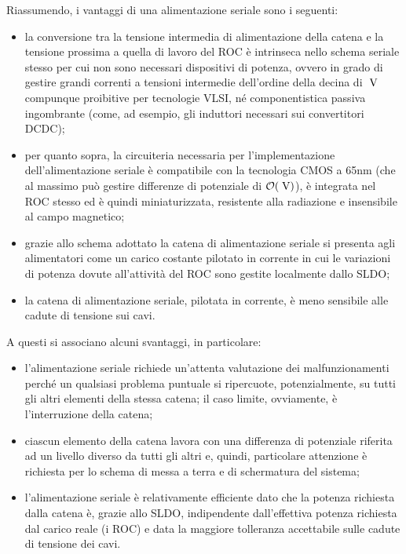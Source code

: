 Riassumendo, i vantaggi di una alimentazione seriale sono i seguenti:
\begin{itemize}
\item la conversione tra la tensione intermedia di alimentazione della catena e la tensione prossima a quella di lavoro del ROC \`e intrinseca nello schema seriale stesso per cui non sono necessari dispositivi di potenza, ovvero in grado di gestire grandi correnti a tensioni intermedie dell'ordine della decina di $\rm \; V$ compunque proibitive per tecnologie VLSI, n\'e componentistica passiva ingombrante (come, ad esempio, gli induttori necessari sui convertitori DCDC);
\item per quanto sopra, la circuiteria necessaria per l'implementazione dell'alimentazione seriale \`e compatibile con la tecnologia CMOS a 65nm (che al massimo pu\`o gestire differenze di potenziale di ${\cal O}(\rm \; V)$), \`e integrata nel ROC stesso ed \`e quindi miniaturizzata, resistente alla radiazione e insensibile al campo magnetico; 
\item grazie allo schema adottato la catena di alimentazione seriale si presenta agli alimentatori come un carico costante pilotato in corrente in cui le variazioni di potenza dovute all'attivit\`a del ROC sono gestite localmente dallo SLDO;
\item la catena di alimentazione seriale, pilotata in corrente, \`e meno sensibile alle cadute di tensione sui cavi.
\end{itemize}
A questi si associano alcuni svantaggi, in particolare:
\begin{itemize}
\item l'alimentazione seriale richiede un'attenta valutazione dei malfunzionamenti perch\'e un qualsiasi problema puntuale si ripercuote, potenzialmente, su tutti gli altri elementi della stessa catena; il caso limite, ovviamente, \`e l'interruzione della catena;
\item ciascun elemento della catena lavora con una differenza di potenziale riferita ad un livello diverso da tutti gli altri e, quindi, particolare attenzione \`e richiesta per lo schema di messa a terra e di schermatura del sistema;
\item l'alimentazione seriale \`e relativamente efficiente dato che la potenza richiesta dalla catena \`e, grazie allo SLDO, indipendente dall'effettiva potenza richiesta dal carico reale (i ROC) e data la maggiore tolleranza accettabile sulle cadute di tensione dei cavi. 
\end{itemize}

